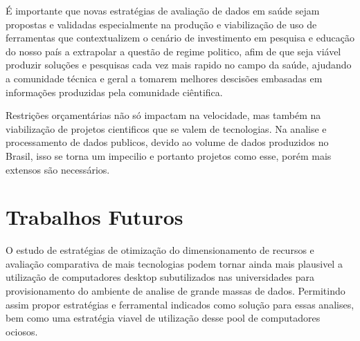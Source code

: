 É importante que novas estratégias de avaliação de dados em saúde sejam propostas e validadas especialmente na produção e viabilização de uso de ferramentas que contextualizem o cenário de investimento em pesquisa e educação do nosso país a extrapolar a questão de regime politico, afim de que seja viável produzir soluções e pesquisas cada vez mais rapido no campo da saúde, ajudando a comunidade técnica e geral a tomarem melhores descisões embasadas em informações produzidas pela comunidade ciêntifica. 

Restrições orçamentárias não só impactam na velocidade, mas também na viabilização de projetos cientificos que se valem de tecnologias. Na analise e processamento de dados publicos, devido ao volume de dados produzidos no Brasil, isso se torna um impecilio e portanto projetos como esse, porém mais extensos são necessários.

\section{Trabalhos Futuros}
\label{sec:trabalhosFuturos}

O estudo de estratégias de otimização do dimensionamento de recursos e avaliação comparativa de mais tecnologias podem tornar ainda mais plausivel a utilização de computadores desktop subutilizados nas universidades para provisionamento do ambiente de analise de grande massas de dados. Permitindo assim propor estratégias e ferramental indicados como solução para essas analises, bem como uma estratégia viavel de utilização desse pool de computadores ociosos.


